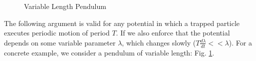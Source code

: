 \documentclass[12pt]{article}
\begin{document}
\begin{figure}[!htb]
  \caption{\label{fig:my-label2} Variable Length Pendulum}
\end{figure}

The following argument is valid for any potential in which a trapped particle executes periodic motion of period $T$. If we also enforce that the potential depends on some variable parameter $\lambda$, which changes slowly ($T\frac{d\lambda}{dt}<<\lambda$). For a concrete example, we consider a pendulum of variable length: Fig. \ref{fig:my-label2}.
\end{document}
